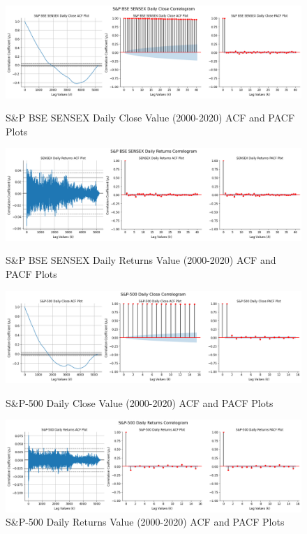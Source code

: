 \documentclass[conference]{IEEEtran}
\begin{document}
\onecolumn
\begin{figure}[htbp]
	\centering
	\includegraphics[scale = 1.5, width = \textwidth]{images/SENSEX ACF and PACF Plot.png}
	\vspace{-0.3in}
	\caption{S\&P BSE SENSEX Daily Close Value (2000-2020) ACF and PACF Plots}
	\label{fig: s_and_p_bse_sensex_acf_and_pcf_plots}
	
	\vspace{0.1in}
	\includegraphics[scale = 1.5, width = \textwidth]{images/SENSEX Change ACF, PACF Plots.png}
	\vspace{-0.3in}
	\caption{S\&P BSE SENSEX Daily Returns Value (2000-2020) ACF and PACF Plots}
	\label{fig: s_and_p_bse_sensex_percentage_change_acf_and_pacf_plots}
	
	\vspace{0.1in}
	\includegraphics[scale = 1.5, width = \textwidth]{images/S&P-500 ACF, PACF Plots.png}
	\vspace{-0.3in}
	\caption{S\&P-500 Daily Close Value (2000-2020) ACF and PACF Plots}
	\label{fig: s_and_p_500_acf_and_pacf_plots}
	
	\vspace{0.1in}
	\includegraphics[scale = 1.5, width = \textwidth]{images/S&P-500 Change ACF PACF Plot.png}
	\vspace{-0.3in}
	\caption{S\&P-500 Daily Returns Value (2000-2020) ACF and PACF Plots}
	\label{fig: s_and_p_500_percentage_change_acf_and_pacf_plots}
\end{figure}
\end{document}
